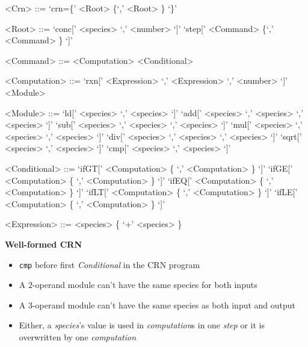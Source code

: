 \setlength{\grammarparsep}{8pt plus 1pt minus 1pt} %
\setlength{\grammarindent}{10em} %

\begin{grammar}

<Crn> ::= `crn=\{' <Root> \{`,' <Root> \} `\}' 

<Root> ::= `conc[' <species> `,' <number> `]' \alt `step[' <Command> \{`,' <Command> \} `]'

<Command> ::= <Computation> \alt <Conditional>

<Computation> ::= `rxn[' <Expression> `,' <Expression> `,' <number> `]' \alt <Module>

<Module> ::= `ld[' <species> `,' <species> `]'
\alt `add[' <species> `,' <species> `,' <species> `]'
\alt `sub[' <species> `,' <species> `,' <species> `]'
\alt `mul[' <species> `,' <species> `,' <species> `]'
\alt `div[' <species> `,' <species> `,' <species> `]'
\alt `sqrt[' <species> `,' <species> `]'
\alt `cmp[' <species> `,' <species> `]'

<Conditional> ::= `ifGT[' <Computation> \{ `,' <Computation> \} `]'
\alt `ifGE[' <Computation> \{ `,' <Computation> \} `]'
\alt `ifEQ[' <Computation> \{ `,' <Computation> \} `]'
\alt `ifLT[' <Computation> \{ `,' <Computation> \} `]'
\alt `ifLE[' <Computation> \{ `,' <Computation> \} `]'

<Expression> ::= <species> \{ `+' <species> \}
\end{grammar}

\newpage



\textbf{Well-formed CRN}
\begin{itemize}
    \item \texttt{cmp} before first \textit{Conditional} in the CRN program
    \item A 2-operand module can't have the same species for both inputs
    \item A 3-operand module can't have the same species as both input and output
    \item Either, a \textit{species}'s value is used in \textit{computation}s in one \textit{step} or it is overwritten by one \textit{computation}
\end{itemize}